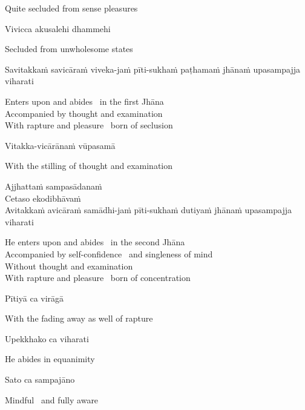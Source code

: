 \begin{english}
  Quite secluded from sense pleasures
\end{english}

Vivicca akusalehi dhammehi

\begin{english}
  Secluded from unwholesome states
\end{english}

Savitakkaṁ savicāraṁ viveka-jaṁ pīti-sukhaṁ paṭhamaṁ jhānaṁ upasampajja viharati

\begin{english}
  Enters upon and abides \breathmark\ in the first Jhāna\\
  Accompanied by thought and examination\\
  With rapture and pleasure \breathmark\ born of seclusion
\end{english}

Vitakka-vicārānaṁ vūpasamā

\begin{english}
  With the stilling of thought and examination
\end{english}

Ajjhattaṁ sampasādanaṁ\\
Cetaso ekodibhāvaṁ\\
Avitakkaṁ avicāraṁ samādhi-jaṁ pīti-sukhaṁ dutiyaṁ jhānaṁ upasampajja viharati

\begin{english}
  He enters upon and abides \breathmark\ in the second Jhāna\\
  Accompanied by self-confidence \breathmark\ and singleness of mind\\
  Without thought and examination\\
  With rapture and pleasure \breathmark\ born of concentration
\end{english}

Pītiyā ca virāgā

\begin{english}
  With the fading away as well of rapture
\end{english}

Upekkhako ca viharati

\begin{english}
  He abides in equanimity
\end{english}

Sato ca sampajāno

\begin{english}
  Mindful \breathmark\ and fully aware
\end{english}

